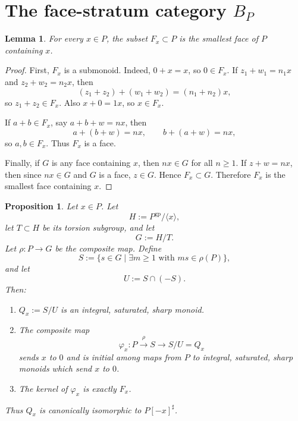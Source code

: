 \documentclass[12pt]{article}
\newtheorem{proposition}[theorem]{Proposition}
\newtheorem{lemma}[theorem]{Lemma}
\theoremstyle{definition}
\theoremstyle{remark}
\numberwithin{equation}{section}
\newcommand{\gp}{\mathrm{gp}}
\begin{document}
\section{The face-stratum category \(B_P\)}

\begin{lemma}\label{lem:face-generated}
For every \(x\in P\), the subset \(F_x\subset P\) is the smallest face of \(P\) containing \(x\).
\end{lemma}

\begin{proof}
First, \(F_x\) is a submonoid.  Indeed, \(0+x=x\), so \(0\in F_x\).  If \(z_1+w_1=n_1x\) and \(z_2+w_2=n_2x\), then
\[
(z_1+z_2)+(w_1+w_2)=(n_1+n_2)x,
\]
so \(z_1+z_2\in F_x\).  Also \(x+0=1x\), so \(x\in F_x\).

If \(a+b\in F_x\), say \(a+b+w=nx\), then
\[
a+(b+w)=nx,\qquad b+(a+w)=nx,
\]
so \(a,b\in F_x\).  Thus \(F_x\) is a face.

Finally, if \(G\) is any face containing \(x\), then \(nx\in G\) for all \(n\geq 1\).  If \(z+w=nx\), then since \(nx\in G\) and \(G\) is a face, \(z\in G\).  Hence \(F_x\subset G\).  Therefore \(F_x\) is the smallest face containing \(x\).
\end{proof}

\begin{proposition}\label{prop:Qx-model}
Let \(x\in P\).  Let
\[
H:=P^{\gp}/\langle x\rangle,
\]
let \(T\subset H\) be its torsion subgroup, and let
\[
G:=H/T.
\]
Let \(\rho:P\to G\) be the composite map.  Define
\[
S:=\{s\in G\mid \exists m\geq 1\text{ with }ms\in \rho(P)\},
\]
and let
\[
U:=S\cap (-S).
\]
Then:
\begin{enumerate}[label=(\roman*)]
\item \(Q_x:=S/U\) is an integral, saturated, sharp monoid.
\item The composite map
\[
\varphi_x:P\xrightarrow{\rho}S\longrightarrow S/U=Q_x
\]
sends \(x\) to \(0\) and is initial among maps from \(P\) to integral, saturated, sharp monoids which send \(x\) to \(0\).
\item The kernel of \(\varphi_x\) is exactly \(F_x\).
\end{enumerate}
Thus \(Q_x\) is canonically isomorphic to \(P[-x]^\sharp\).
\end{proposition}
\end{document}
